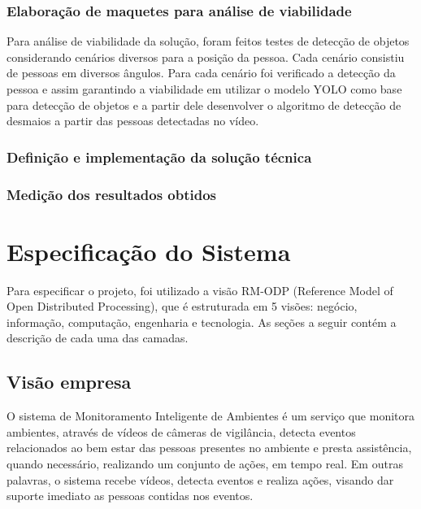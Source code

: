 \documentclass[]{politex}
\begin{document}
\subsection{Elaboração de maquetes para análise de viabilidade}
Para análise de viabilidade da solução, foram feitos testes de detecção de objetos considerando cenários diversos para a posição da pessoa. Cada cenário consistiu de pessoas em diversos ângulos. Para cada cenário foi verificado a detecção da pessoa e assim garantindo a viabilidade em utilizar o modelo YOLO como base para detecção de objetos e a partir dele desenvolver o algoritmo de detecção de desmaios a partir das pessoas detectadas no vídeo.

\subsection{Definição e implementação da solução técnica}


\subsection{Medição dos resultados obtidos}



\chapter{Especificação do Sistema}
Para especificar o projeto, foi utilizado a visão RM-ODP (Reference Model of Open Distributed Processing), que é estruturada em 5 visões: negócio, informação, computação, engenharia e tecnologia. As seções a seguir contém a descrição de cada uma das camadas.

\section{Visão empresa}
O sistema de Monitoramento Inteligente de Ambientes é um serviço que monitora ambientes, através de vídeos de câmeras de vigilância, detecta eventos relacionados ao bem estar das pessoas presentes no ambiente e presta assistência, quando necessário, realizando um conjunto de ações, em tempo real. Em outras palavras, o sistema recebe vídeos, detecta eventos e realiza ações, visando dar suporte imediato as pessoas contidas nos eventos.
\end{document}
